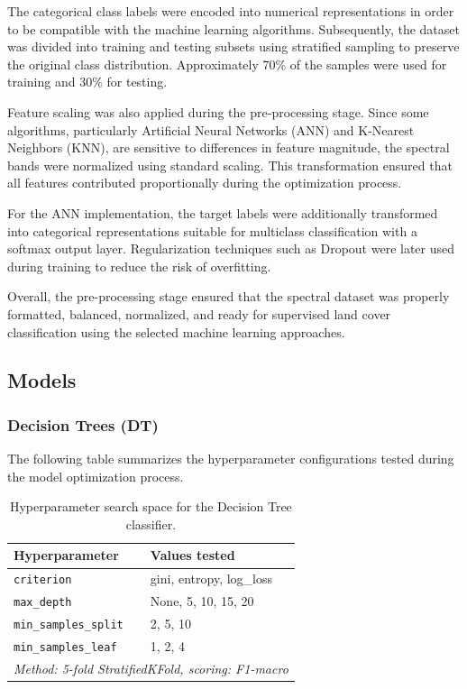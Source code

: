\documentclass{article}
\begin{document}
The categorical class labels were encoded into numerical representations in order to be compatible with the machine learning algorithms. Subsequently, the
dataset was divided into training and testing subsets using stratified sampling to preserve the original class distribution. Approximately 70\% of the
samples were used for training and 30\% for testing.

Feature scaling was also applied during the pre-processing stage. Since some algorithms, particularly Artificial Neural Networks (ANN) and K-Nearest
Neighbors (KNN), are sensitive to differences in feature magnitude, the spectral bands were normalized using standard scaling. This transformation ensured
that all features contributed proportionally during the optimization process.

For the ANN implementation, the target labels were additionally transformed into categorical representations suitable for multiclass classification with a
softmax output layer. Regularization techniques such as Dropout were later used during training to reduce the risk of overfitting.

Overall, the pre-processing stage ensured that the spectral dataset was properly formatted, balanced, normalized, and ready for supervised land cover
classification using the selected machine learning approaches.

\subsection{Models}

\subsubsection{Decision Trees (DT)}
The following table summarizes the hyperparameter configurations tested during the model optimization process.

\begin{table}[H]
    \centering
    \caption{Hyperparameter search space for the Decision Tree classifier.}
    \label{tab:dt_hpo}
    \begin{tabular}{ll}
        \hline
        \textbf{Hyperparameter} & \textbf{Values tested} \\
        \hline
        \texttt{criterion}         & gini, entropy, log\_loss \\
        \texttt{max\_depth}        & None, 5, 10, 15, 20 \\
        \texttt{min\_samples\_split} & 2, 5, 10 \\
        \texttt{min\_samples\_leaf}  & 1, 2, 4 \\
        \hline
        \multicolumn{2}{l}{\textit{Method: 5-fold StratifiedKFold, scoring: F1-macro}} \\
        \hline
    \end{tabular}
\end{table}
\end{document}
